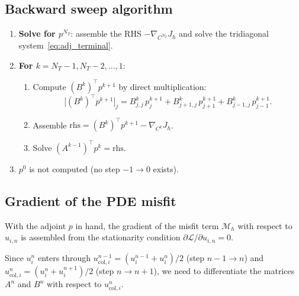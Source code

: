 \documentclass[11pt, a4paper]{article}
\theoremstyle{definition}
\theoremstyle{plain}
\begin{document}
\subsection{Backward sweep algorithm}

\begin{enumerate}
  \item \textbf{Solve for $p^{N_T}$}: assemble the RHS
    $-\nabla_{C^{N_T}} J_h$ and solve the tridiagonal system~\eqref{eq:adj_terminal}.
  \item \textbf{For $k = N_T-1, N_T-2, \ldots, 1$}:
    \begin{enumerate}
      \item Compute $(B^k)^\top p^{k+1}$ by direct multiplication:
        \begin{equation}\label{eq:BT_mult}
          \bigl[(B^k)^\top p^{k+1}\bigr]_j
          = B^k_{j,j}\,p^{k+1}_j
            + B^k_{j+1,j}\,p^{k+1}_{j+1}
            + B^k_{j-1,j}\,p^{k+1}_{j-1}.
        \end{equation}
      \item Assemble $\text{rhs} = (B^k)^\top p^{k+1} - \nabla_{C^k} J_h$.
      \item Solve $(A^{k-1})^\top p^k = \text{rhs}$.
    \end{enumerate}
  \item $p^0$ is not computed (no step $-1 \to 0$ exists).
\end{enumerate}

\subsection{Gradient of the PDE misfit}

With the adjoint $p$ in hand, the gradient of the misfit term $\mathcal{M}_h$
with respect to $u_{i,n}$ is assembled from the stationarity condition
$\partial \mathcal{L} / \partial u_{i,n} = 0$.

Since $u_i^n$ enters through $u_{\text{col},i}^{n-1} = (u_i^{n-1} + u_i^n)/2$
(step $n-1 \to n$) and $u_{\text{col},i}^n = (u_i^n + u_i^{n+1})/2$
(step $n \to n+1$), we need to differentiate the matrices $A^n$ and $B^n$
with respect to $u_{\text{col},i}^n$.
\end{document}
